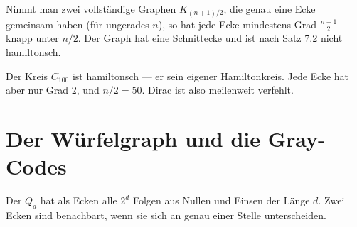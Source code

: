 \begin{warnung}
Nimmt man zwei vollständige Graphen $K_{(n+1)/2}$, die genau eine Ecke gemeinsam haben (für ungerades $n$), so hat jede Ecke mindestens Grad $\frac{n-1}{2}$ --- knapp unter $n/2$. Der Graph hat eine Schnittecke und ist nach Satz 7.2 nicht hamiltonsch.

Der Kreis $C_{100}$ ist hamiltonsch --- er  sein eigener Hamiltonkreis. Jede Ecke hat aber nur Grad $2$, und $n/2 = 50$. Dirac ist also meilenweit verfehlt.

\begin{center}
\begin{minipage}{0.88\textwidth}
\end{minipage}
\end{center}
\end{warnung}

\section{Der Würfelgraph und die Gray-Codes}

\begin{definition}
Der  $Q_d$ hat als Ecken alle $2^d$ Folgen aus Nullen und Einsen der Länge $d$. Zwei Ecken sind benachbart, wenn sie sich an genau einer Stelle unterscheiden.
\end{definition}

